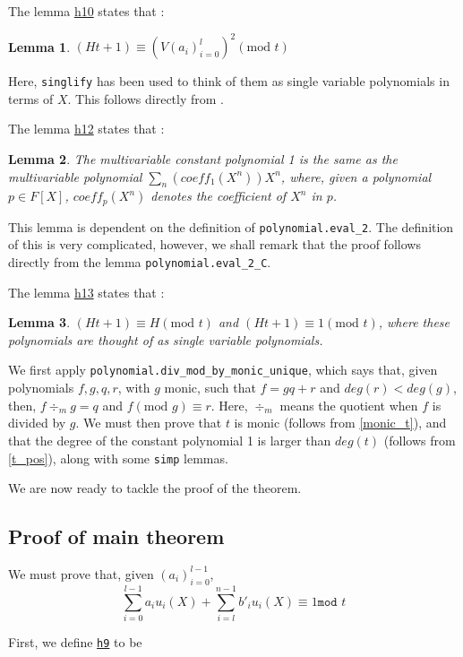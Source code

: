 \documentclass{article}
\newtheorem{lemma}{Lemma}
\theoremstyle{definition}
\theoremstyle{remark}
\begin{document}
The lemma \href{https://github.com/BoltonBailey/formal-snarks-project/blob/7fd9cd122f5887f88f6a706b4f2a68a7153c7381/src/snarks/babysnark/knowledge_soundness.lean#L438}{h10} states that :
\theoremstyle{lemma}
\begin{lemma} \label{h10}
  $ (Ht + 1) \equiv (V (a_i)_{i = 0}^{l})^2 (\text{mod }t) $
\end{lemma}
Here, \texttt{singlify} has been used to think of them as single variable polynomials in terms of $X$. This follows directly from .

The lemma \href{https://github.com/BoltonBailey/formal-snarks-project/blob/7fd9cd122f5887f88f6a706b4f2a68a7153c7381/src/snarks/babysnark/knowledge_soundness.lean#L449}{h12} states that :
\theoremstyle{lemma}
\begin{lemma} \label{h12}
  The multivariable constant polynomial 1 is the same as the multivariable polynomial $\sum_{n} (coeff_{1} (X^n)) X^n$, where, given a polynomial $p \in F[X]$, $coeff_{p} (X^n)$ denotes 
  the coefficient of $X^n$ in $p$.
\end{lemma}
This lemma is dependent on the definition of \texttt{polynomial.eval\_2}. The definition of this is very complicated, however, we shall remark that the proof follows directly from the lemma 
\texttt{polynomial.eval\_2\_C}.

The lemma \href{https://github.com/BoltonBailey/formal-snarks-project/blob/7fd9cd122f5887f88f6a706b4f2a68a7153c7381/src/snarks/babysnark/knowledge_soundness.lean#L454}{h13} states that :
\theoremstyle{lemma}
\begin{lemma} \label{h13}
  $ (Ht + 1) \equiv H (\text{mod }t) $ and $ (Ht + 1) \equiv 1 (\text{mod }t) $, where these polynomials are thought of as single variable polynomials.
\end{lemma}
We first apply \texttt{polynomial.div\_mod\_by\_monic\_unique}, which says that, given polynomials $f, g, q, r$, with $g$ monic, such that $f = g q + r$ and $deg(r) < deg (g)$, then,
$f \div_m g = q$ and $f (\text{mod }g) \equiv r$. Here, $\div_m$ means the quotient when $f$ is divided by $g$. We must then prove that $t$ is monic (follows from \ref{monic_t}), and 
that the degree of the constant polynomial 1 is larger than $deg(t)$ (follows from \ref{t_pos}), along with some \texttt{simp} lemmas.

We are now ready to tackle the proof of the theorem.

\subsection{Proof of main theorem}
We must prove that, given $(a_i)_{i = 0}^{l - 1}$,
$$ \sum_{i = 0}^{l - 1} a_i u_i(X) + \sum_{i = l}^{n - 1} b'_i u_i (X) \equiv 1 \texttt{mod } t $$

First, we define \href{https://github.com/BoltonBailey/formal-snarks-project/blob/7fd9cd122f5887f88f6a706b4f2a68a7153c7381/src/snarks/babysnark/knowledge_soundness.lean#L426}{\texttt{h9}} 
to be 



\end{document}
